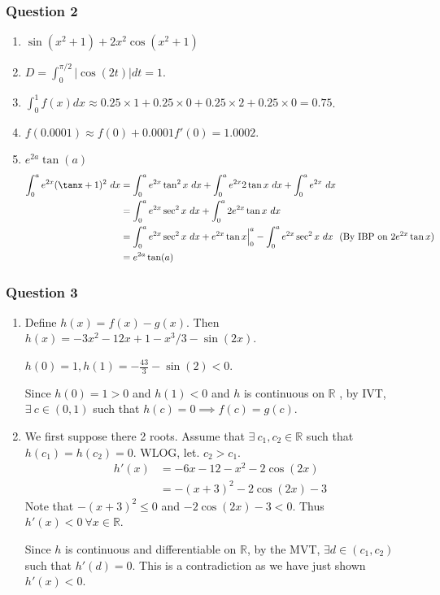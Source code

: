 \documentclass{article}
\begin{document}
\subsubsection*{Question 2}
\begin{enumerate}[label=\alph*)]
    \item $\sin(x^2+1)+2x^2\cos(x^2+1)$
    \item $D=\int^{\pi/2}_0 |\cos(2t)| dt = 1$. 
    \item $\int_0^1 f(x) dx \approx 0.25 \times 1 + 0.25 \times 0 +0.25 \times 2 + 0.25 \times 0 = 0.75$.
    \item $f(0.0001) \approx f(0) + 0.0001f'(0) = 1.0002$.
    \item $e^{2a}\tan(a)$
    \begin{align*}
        \int_0^a e^{2x}(\tanx+1)^2 \ dx &= \int_0^a e^{2x}\tan^2x \ dx + \int_0^a e^{2x}2\tan x \ dx + \int_0^a e^{2x} \ dx \\
        &= \int_0^a e^{2x}\sec^2x \ dx + \int_0^a 2e^{2x}\tan x \ dx \\
        &= \int_0^a e^{2x}\sec^2x \ dx + e^{2x}\tan x\Big|^{a}_0 - \int_0^a e^{2x}\sec^2x \ dx \ \ \text{(By IBP on $ 2e^{2x}\tan x$)} \\
        &= e^{2a}\tan(a)
    \end{align*}
\end{enumerate}

\subsubsection*{Question 3}
\begin{enumerate}[label=\roman*)]
    \item Define $h(x) = f(x) - g(x)$. Then $h(x) = -3x^2 - 12x + 1 - x^3/3 - \sin(2x)$.
    
    $h(0) = 1, h(1) = -\frac{43}{3} - \sin(2)< 0$.

    Since $h(0) = 1 > 0$ and $h(1) < 0$ and $h$ is continuous on $\mathbb{R}$ , by IVT, $ \exists \ c \in (0,1)$ such that $h(c) = 0 \implies f(c) = g(c)$.
    
    \item We first suppose there 2 roots. Assume that $\exists \ c_1,c_2 \in \mathbb{R}$ such that $h(c_1) = h(c_2) = 0$. WLOG, let. $c_2 > c_1$.
    \begin{align*}
        h'(x) &= -6x - 12 - x^2 - 2\cos(2x) \\
        &= -(x+3)^2 - 2\cos(2x) - 3
    \end{align*}
    Note that $-(x+3)^2\leq 0$ and $-2\cos(2x) - 3 < 0$. Thus $h'(x) < 0 \ \forall x \in \mathbb{R}$.
    
    Since $h$ is continuous and differentiable on $\mathbb{R}$, by the MVT, $\exists d \in (c_1,c_2)$ such that $h'(d) = 0$. This is a contradiction as we have just shown $h'(x) < 0$.
\end{enumerate}
\end{document}
